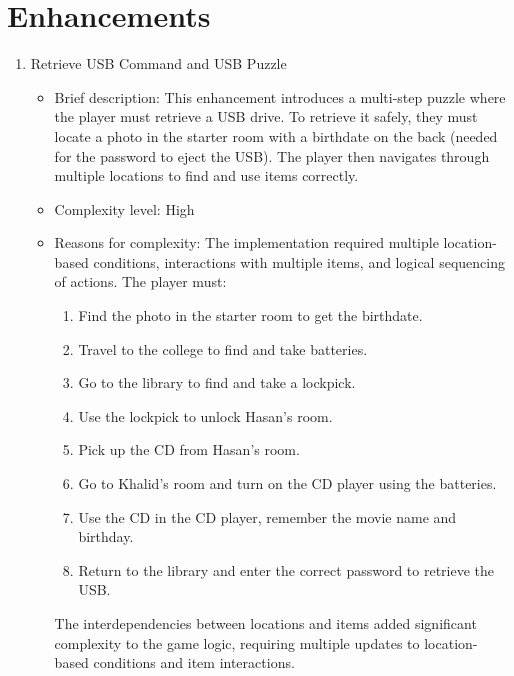 \documentclass[11pt]{article}
\begin{document}
\section*{Enhancements}
\begin{enumerate}
    \item Retrieve USB Command and USB Puzzle
    \begin{itemize}
        \item Brief description: This enhancement introduces a multi-step puzzle where the player must retrieve a
        USB drive. To retrieve it safely, they must locate a photo in the starter room with a birthdate on the back
        (needed for the password to eject the USB). The player then navigates through multiple locations to find and
        use items correctly.
        \item Complexity level: High
        \item Reasons for complexity: The implementation required multiple location-based conditions, interactions with
        multiple items, and logical sequencing of actions. The player must:
        \begin{enumerate}
            \item Find the photo in the starter room to get the birthdate.
            \item Travel to the college to find and take batteries.
            \item Go to the library to find and take a lockpick.
            \item Use the lockpick to unlock Hasan's room.
            \item Pick up the CD from Hasan's room.
            \item Go to Khalid's room and turn on the CD player using the batteries.
            \item Use the CD in the CD player, remember the movie name and birthday.
            \item Return to the library and enter the correct password to retrieve the USB.
        \end{enumerate}
        The interdependencies between locations and items added significant complexity to the game logic, requiring
        multiple updates to location-based conditions and item interactions.
    \end{itemize}
\end{enumerate}
\end{document}
